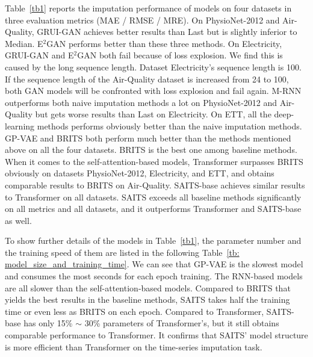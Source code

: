 \documentclass{article}
\begin{document}
Table~\ref{tb1} reports the imputation performance of models on four datasets in three evaluation metrics (MAE / RMSE / MRE). On PhysioNet-2012 and Air-Quality, GRUI-GAN achieves better results than Last but is slightly inferior to Median. E$^2$GAN performs better than these three methods. On Electricity, GRUI-GAN and E$^2$GAN both fail because of loss explosion. We find this is caused by the long sequence length. Dataset Electricity's sequence length is 100. If the sequence length of the Air-Quality dataset is increased from 24 to 100, both GAN models will be confronted with loss explosion and fail again. M-RNN outperforms both naive imputation methods a lot on PhysioNet-2012 and Air-Quality but gets worse results than Last on Electricity. On ETT, all the deep-learning methods performs obviously better than the naive imputation methods. GP-VAE and BRITS both perform much better than the methods mentioned above on all the four datasets. BRITS is the best one among baseline methods. When it comes to the self-attention-based models, Transformer surpasses BRITS obviously on datasets PhysioNet-2012, Electricity, and ETT, and obtains comparable results to BRITS on Air-Quality. SAITS-base achieves similar results to Transformer on all datasets. SAITS exceeds all baseline methods significantly on all metrics and all datasets, and it outperforms Transformer and SAITS-base as well.

To show further details of the models in Table~\ref{tb1}, the parameter number and the training speed of them are listed in the following Table~\ref{tb: model_size_and_training_time}. We can see that GP-VAE is the slowest model and consumes the most seconds for each epoch training. The RNN-based models are all slower than the self-attention-based models. Compared to BRITS that yields the best results in the baseline methods, SAITS takes half the training time or even less as BRITS on each epoch. Compared to Transformer, SAITS-base has only 15\% $\sim$ 30\% parameters of Transformer's, but it still obtains comparable performance to Transformer. It confirms that SAITS' model structure is more efficient than Transformer on the time-series imputation task.
\end{document}
